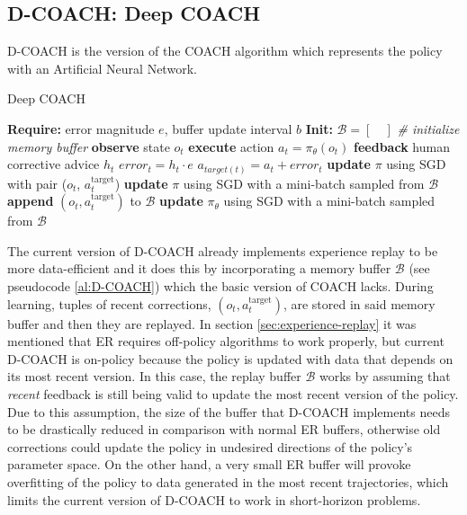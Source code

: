 \subsection{D-COACH: Deep COACH}
\label{sec:D-COACH}


D-COACH \cite{ResearchAssignmentpaper} is the  version of the COACH algorithm which represents the policy with an Artificial Neural Network.

\begin{algorithm}[H]
\caption{Deep COACH}\label{algorithm:DeepCOACH}
\begin{algorithmic}[1]
\State \textbf{Require:} error magnitude $e$, buffer update interval $b$
\State \textbf{Init:} $\mathcal{B} = [\quad]$  \emph{\# initialize memory buffer}
\State \textbf{observe} state $o_{t}$
\State \textbf{execute} action $a_{t}=\pi_{\theta}(o_{t})$
\State \textbf{feedback} human corrective advice $h_{t}$
\State $\mathit{error}_{t} = h_{t}\cdot e$
\State $a_{target(t)} = a_{t} + \mathit{error}_{t}$
\State \textbf{update} $\pi$ using SGD with pair ($o_{t}$, $a^{\text{target}}_{t}$)
\State \textbf{update} $\pi$ using SGD with a mini-batch sampled from $\mathcal{B}$
\State \textbf{append} $(o_{t}, a^{\text{target}}_{t})$ to $\mathcal{B}$
\EndIf
{}
\State \textbf{update} $\pi_{\theta}$ using SGD with a mini-batch sampled from $\mathcal{B}$
\EndIf
\EndFor
\end{algorithmic}
\label{al:D-COACH}
\end{algorithm}

The current version of D-COACH already implements experience replay to be more data-efficient and it does this by incorporating a memory buffer $\mathcal{B}$ (see pseudocode \ref{al:D-COACH}) which the basic version of COACH lacks. During learning, tuples of recent corrections, $(o_t, a^{\text{target}}_t)$, are stored in said memory buffer and then they are replayed. In section \ref{sec:experience-replay} it was mentioned that ER requires off-policy algorithms to work properly, but current D-COACH is on-policy because the policy is updated with data that depends on its most recent version. In this case, the replay buffer $\mathcal{B}$ works by assuming that \textit{recent} feedback is still being valid to update the most recent version of the policy. Due to this assumption, the size of the buffer that D-COACH implements needs to be drastically reduced in comparison with normal ER buffers, otherwise old corrections could update the policy in undesired directions of the policy’s parameter space. On the other hand, a very small ER buffer will provoke overfitting of the policy to data generated in the most recent trajectories, which limits the current version of D-COACH to work in short-horizon problems.


